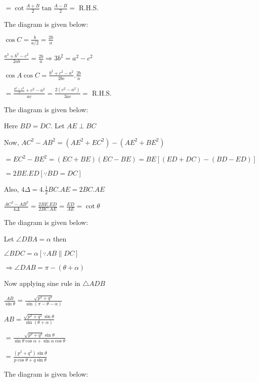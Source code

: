   $= \cot \frac{A + B}{2}\tan\frac{A - B}{2} =$ R.H.S.

\item The diagram is given below:

  \startplacefigure
    \externalfigure[18_4.pdf]
  \stopplacefigure

  $\cos C = \frac{b}{a/2} = \frac{2b}{a}$

  $\frac{a^2 + b^2 - c^2}{2ab} = \frac{2b}{a} \Rightarrow 3b^2 = a^2 - c^2$

  $\cos A\cos C = \frac{b^2 + c^2 - a^2}{2bc}.\frac{2b}{a}$

  $= \frac{\frac{a^2 - c^2}{3} + c^2 - a^2}{ac} = \frac{2(c^2 - a^2)}{3ac} =$ R.H.S.

\item The diagram is given below:

  \startplacefigure
    \externalfigure[18_5.pdf]
  \stopplacefigure

  Here $BD = DC.$ Let $AE\perp BC$

  Now, $AC^2 - AB^2 = (AE^2 + EC^2) - (AE^2 + BE^2)$

  $= EC^2 - BE^2 = (EC + BE)(EC - BE) = BE[(ED + DC) - (BD - ED)]$

  $= 2BE.ED[\because BD=DC]$

  Also, $4\Delta = 4.\frac{1}{2}BC.AE = 2BC.AE$

  $\frac{AC^2 - AB^2}{4\Delta} = \frac{2BE.ED}{2BC.AE} = \frac{ED}{AE} = \cot\theta$

\item The diagram is given below:

  \startplacefigure
    \externalfigure[18_6.pdf]
  \stopplacefigure

  Let $\angle DBA = \alpha$ then

  $\angle BDC = \alpha [\because AB\parallel DC]$

  $\Rightarrow \angle DAB = \pi - (\theta + \alpha)$

  Now applying sine rule in $\triangle ADB$

  $\frac{AB}{\sin \theta} = \frac{\sqrt{p^2 + q^2}}{\sin(\pi  - \theta - \alpha)}$

  $AB = \frac{\sqrt{p^2 + q^2}\sin\theta}{\sin(\theta + \alpha)}$

  $= \frac{\sqrt{p^2 + q^2}\sin\theta}{\sin\theta\cos\alpha + \sin\alpha\cos\theta}$


  $= \frac{(p^2 + q^2)\sin\theta}{p\cos\theta + q\sin\theta}$

\item The diagram is given below:


